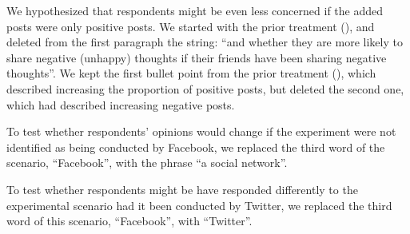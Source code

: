 We hypothesized that respondents might be even less concerned if the added posts were only positive posts.
We started with the prior treatment (), and deleted from the first paragraph the string: ``and whether they are more likely to share negative (unhappy) thoughts if their friends have been sharing negative thoughts''.  We kept the first bullet point from the prior treatment (), which described increasing the proportion of positive posts, but deleted the second one, which had described increasing negative posts.

To test whether respondents' opinions would change if the experiment were not identified as being conducted by Facebook, we replaced the third word of the scenario, ``Facebook'', with the phrase ``a social network''.

To test whether respondents might be have responded differently to the experimental scenario had it been conducted by Twitter, we replaced the third word of this scenario, ``Facebook'', with ``Twitter''.
